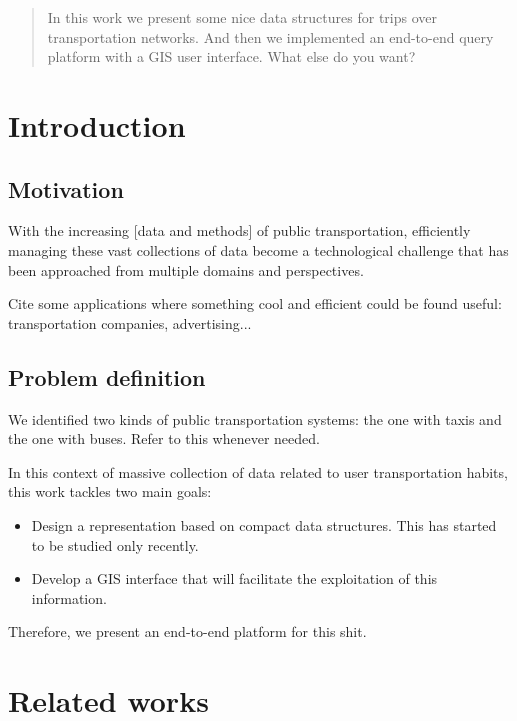 \documentclass{UniVieCS_PhD} %
\begin{document}
    \Titlepage %
    \clearpage
	
	\pagebreak

	\tableofcontents %
	
	\pagebreak
	
	\begin{abstract}
		In this work we present some nice data structures for trips over transportation networks. And then we implemented an end-to-end query platform with a GIS user interface. What else do you want?
	\end{abstract}
	
	\section{Introduction}
	\subsection{Motivation}
	With the increasing [data and methods] of public transportation, efficiently managing these vast collections of data become a technological challenge that has been approached from multiple domains and perspectives.
	
	Cite some applications where something cool and efficient could be found useful: transportation companies, advertising...
	
	\subsection{Problem definition}
	\label{sec:pd}
	We identified two kinds of public transportation systems: the one with taxis and the one with buses. Refer to this whenever needed.
	
	In this context of massive collection of data related to user transportation habits, this work tackles two main goals:
	
	\begin{itemize}
	    \item Design a representation based on compact data structures. This has started to be studied only recently.
	    \item Develop a GIS interface that will facilitate the exploitation of this information.
	\end{itemize}
	
	Therefore, we present an end-to-end platform for this shit.
	
	\section{Related works}
\end{document}
